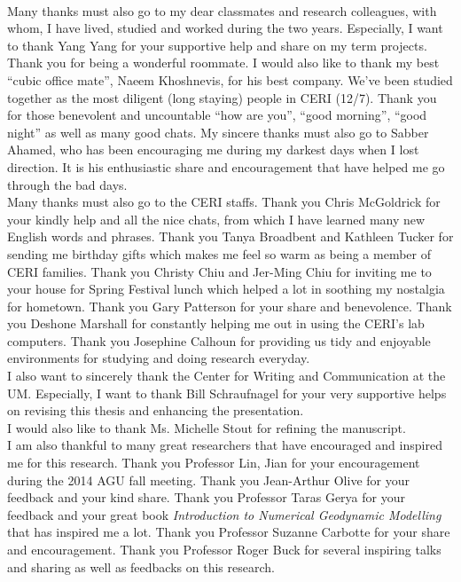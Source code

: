 \\
Many thanks must also go to my dear classmates and research colleagues, with whom, I have lived, studied and worked during the two years. Especially, I want to thank Yang Yang for your supportive help and share on my term projects. Thank you for being a wonderful roommate. I would also like to thank my best ``cubic office mate'', Naeem Khoshnevis, for his best company. We've been studied together as the most diligent (long staying) people in CERI (12/7). Thank you for those benevolent and uncountable ``how are you'', ``good morning'', ``good night'' as well as many good chats. My sincere thanks must also go to Sabber Ahamed, who has been encouraging me during my darkest days when I lost direction. It is his enthusiastic share and encouragement that have helped me go through the bad days. 
\\
Many thanks must also go to the CERI staffs. Thank you Chris McGoldrick for your kindly help and all the nice chats, from which I have learned many new English words and phrases. Thank you Tanya Broadbent and Kathleen Tucker for sending me birthday gifts which makes me feel so warm as being a member of CERI families. Thank you Christy Chiu and Jer-Ming Chiu for inviting me to your house for Spring Festival lunch which helped a lot in soothing my nostalgia for hometown. Thank you Gary Patterson for your share and benevolence. Thank you Deshone Marshall for constantly helping me out in using the CERI's lab computers. Thank you Josephine Calhoun for providing us tidy and enjoyable environments for studying and doing research everyday. 
\\
I also want to sincerely thank the Center for Writing and Communication at the UM. Especially, I want to thank Bill Schraufnagel for your very supportive helps on revising this thesis and enhancing the presentation.
\\
I would also like to thank Ms. Michelle Stout for refining the manuscript.
\\
I am also thankful to many great researchers that have encouraged and inspired me for this research. Thank you Professor Lin, Jian for your encouragement during the 2014 AGU fall meeting. Thank you Jean-Arthur Olive for your feedback and your kind share. Thank you Professor Taras Gerya for your feedback and your great book \textit{Introduction to Numerical Geodynamic Modelling} that has inspired me a lot. Thank you Professor Suzanne Carbotte for your share and encouragement. Thank you Professor Roger Buck for several inspiring talks and sharing as well as feedbacks on this research.
